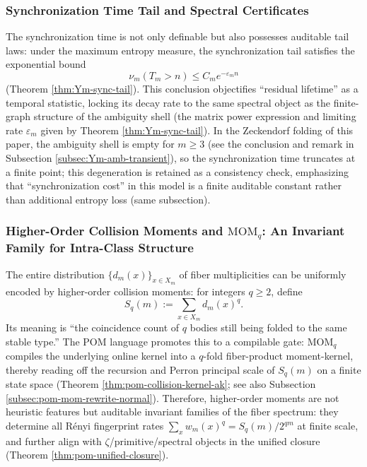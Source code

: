 \subsubsection{Synchronization Time Tail and Spectral Certificates}\label{subsubsec:frt-sync-tail-spectrum}
The synchronization time is not only definable but also possesses auditable tail laws: under the maximum entropy measure, the synchronization tail satisfies the exponential bound
\[
\nu_m(T_m>n)\le C_m e^{-\varepsilon_m n}
\]
(Theorem \ref{thm:Ym-sync-tail}). This conclusion objectifies ``residual lifetime'' as a temporal statistic, locking its decay rate to the same spectral object as the finite-graph structure of the ambiguity shell (the matrix power expression and limiting rate \(\varepsilon_m\) given by Theorem \ref{thm:Ym-sync-tail}). In the Zeckendorf folding of this paper, the ambiguity shell is empty for \(m\ge 3\) (see the conclusion and remark in Subsection \ref{subsec:Ym-amb-transient}), so the synchronization time truncates at a finite point; this degeneration is retained as a consistency check, emphasizing that ``synchronization cost'' in this model is a finite auditable constant rather than additional entropy loss (same subsection).

\subsubsection{Higher-Order Collision Moments and \texorpdfstring{$\mathrm{MOM}_q$}{MOMq}: An Invariant Family for Intra-Class Structure}\label{subsubsec:frt-moments}
The entire distribution \(\{d_m(x)\}_{x\in X_m}\) of fiber multiplicities can be uniformly encoded by higher-order collision moments: for integers \(q\ge 2\), define
\[
S_q(m):=\sum_{x\in X_m}d_m(x)^q.
\]
Its meaning is ``the coincidence count of \(q\) bodies still being folded to the same stable type.'' The POM language promotes this to a compilable gate: \(\mathrm{MOM}_q\) compiles the underlying online kernel into a \(q\)-fold fiber-product moment-kernel, thereby reading off the recursion and Perron principal scale of \(S_q(m)\) on a finite state space (Theorem \ref{thm:pom-collision-kernel-ak}; see also Subsection \ref{subsec:pom-mom-rewrite-normal}). Therefore, higher-order moments are not heuristic features but auditable invariant families of the fiber spectrum: they determine all R\'{e}nyi fingerprint rates \(\sum_x w_m(x)^q=S_q(m)/2^{qm}\) at finite scale, and further align with \(\zeta\)/primitive/spectral objects in the unified closure (Theorem \ref{thm:pom-unified-closure}).

